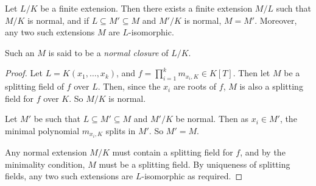 \begin{corollary}
	Let \( L / K \) be a finite extension.
	Then there exists a finite extension \( M / L \) such that \( M / K \) is normal, and if \( L \subseteq M' \subseteq M \) and \( M' / K \) is normal, \( M = M' \).
	Moreover, any two such extensions \( M \) are \( L \)-isomorphic.
\end{corollary}
Such an \( M \) is said to be a \emph{normal closure} of \( L / K \).
\begin{proof}
	Let \( L = K(x_1, \dots, x_k) \), and \( f = \prod_{i=1}^k m_{x_i,K} \in K[T] \).
	Then let \( M \) be a splitting field of \( f \) over \( L \).
	Then, since the \( x_i \) are roots of \( f \), \( M \) is also a splitting field for \( f \) over \( K \).
	So \( M / K \) is normal.

	Let \( M' \) be such that \( L \subseteq M' \subseteq M \) and \( M' / K \) be normal.
	Then as \( x_i \in M' \), the minimal polynomial \( m_{x_i,K} \) splits in \( M' \).
	So \( M' = M \).

	Any normal extension \( M / K \) must contain a splitting field for \( f \), and by the minimality condition, \( M \) must be a splitting field.
	By uniqueness of splitting fields, any two such extensions are \( L \)-isomorphic as required.
\end{proof}

